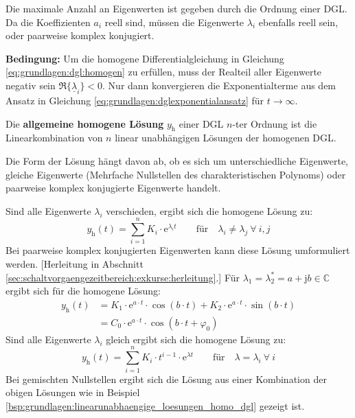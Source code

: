 \begin{frame}
{    %
    Die maximale Anzahl an Eigenwerten ist gegeben durch die Ordnung einer DGL. 
    Da die Koeffizienten $a_i$ reell sind, müssen die Eigenwerte $\lambda_i$ ebenfalls reell sein, oder paarweise komplex konjugiert.

    \textbf{Bedingung:} Um die homogene Differentialgleichung in Gleichung \ref{eq:grundlagen:dgl:homogen} 
    zu erfüllen, muss der Realteil aller Eigenwerte negativ sein $\Re\{\underline{\lambda}_i\}<0$. 
    Nur dann konvergieren die Exponentialterme aus dem Ansatz in Gleichung \ref{eq:grundlagen:dglexponentialansatz}
    für $t \to \infty$.

    Die \textbf{allgemeine homogene Lösung} $y_{\mathrm{h}}$ einer DGL $n$-ter Ordnung ist die Linearkombination
    von $n$ linear unabhängigen Lösungen der homogenen DGL.

    Die Form der Lösung hängt davon ab, ob es sich um unterschiedliche Eigenwerte, gleiche Eigenwerte (Mehrfache Nullstellen des charakteristischen Polynoms) 
    oder paarweise komplex konjugierte Eigenwerte handelt.

    Sind alle Eigenwerte $\lambda_i$ verschieden, ergibt sich die homogene Lösung zu:
    \begin{equation}\label{eq:grundlagen:homogeneloesung:lambdaungleich}
        y_{\mathrm{h}}(t) = \sum_{i=1}^{n} K_i \cdot \mathrm{e}^{\lambda_i t} \qquad \text{für} \quad \lambda_i \neq \lambda_j \ \forall \ i,j
    \end{equation}
    Bei paarweise komplex konjugierten Eigenwerten kann diese Lösung umformuliert werden. [Herleitung in Abschnitt \ref{sec:schaltvorgaengezeitbereich:exkurse:herleitung}.]
    Für $\lambda_1 = \lambda_2^* = a + \mathrm{j} b \in \mathbb{C}$ ergibt sich für die homogene Lösung:
    \begin{equation}\label{eq:grundlagen:homogeneloesung:lambdakomplex}
        \begin{aligned}
        y_{\mathrm{h}}(t) &= K_1 \cdot \mathrm{e}^{a \cdot t} \cdot \cos(b \cdot t) + K_2 \cdot \mathrm{e}^{a \cdot t} \cdot \sin(b \cdot t) \\
        &= C_0 \cdot \mathrm{e}^{a \cdot t} \cdot \cos(b \cdot t + \varphi_0)
        \end{aligned}
    \end{equation}
    Sind alle Eigenwerte $\lambda_i$ gleich ergibt sich die homogene Lösung zu:
    \begin{equation}\label{eq:grundlagen:homogeneloesung:lambdagleich}
        y_{\mathrm{h}}(t) = \sum_{i=1}^{n} K_i \cdot t^{i-1}  \cdot \mathrm{e}^{\lambda t} \qquad \text{für} \quad \lambda = \lambda_i \ \forall \ i
    \end{equation}
    Bei gemischten Nullstellen ergibt sich die Lösung aus einer Kombination der obigen Lösungen wie in
    Beispiel \ref{bsp:grundlagen:linearunabhaengige_loesungen_homo_dgl} gezeigt ist.

}
\end{frame}
